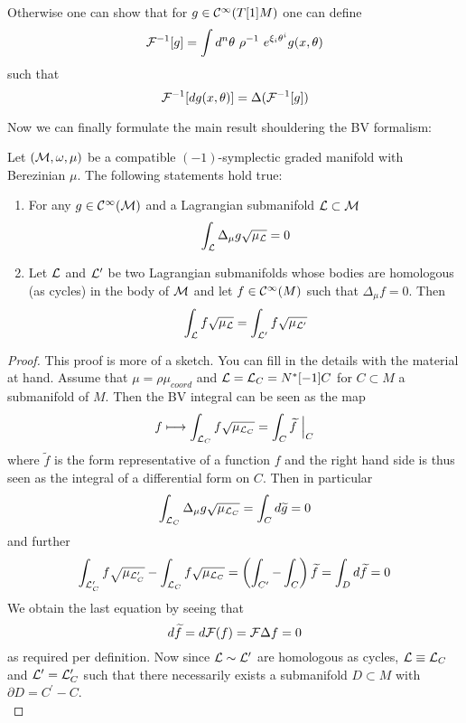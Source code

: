 Otherwise one can show that for $g \in \mathcal{C}^{\infty}(T[1]M)$ one can define
\begin{equation}
  \FF^{-1}[g] = \int d^n \theta \ \rho^{-1} \ e^{\xi_i \theta^i} g(x, \theta)
\end{equation}
such that
\begin{equation}
  {\mathcal{F}}^{-1}[dg(x, \theta)] = \Delta({\mathcal{F}}^{-1}[g])
\end{equation}

Now we can finally formulate the main result shouldering the BV formalism:

\begin{theo}
  Let $(\mathcal{M}, \omega, \mu)$ be a compatible $(-1)$-symplectic graded manifold with Berezinian $\mu$. The following statements hold true:
  \begin{enumerate}
    \item For any $g \in \mathcal{C}^{\infty}(\mathcal{M})$ and a Lagrangian submanifold $\mathcal{L} \subset \mathcal{M}$
    \begin{equation}
      \int_{\mathcal{L}} \Delta_\mu g \sqrt{\mu_{\mathcal{L}}} = 0
    \end{equation}

    \item Let $\mathcal{L}$ and $\mathcal{L}^\prime$ be two Lagrangian submanifolds whose bodies are homologous (as cycles) in the body of $\mathcal{M}$ and let $f \in \mathcal{C}^{\infty}(M)$ such that $\Delta_\mu f = 0$. Then
    \begin{equation}
      \int_{\mathcal{L}} f \sqrt{\mu_{\mathcal{L}}} = \int_{\mathcal{L}^\prime} f \sqrt{\mu_{\mathcal{L}^\prime}}
    \end{equation}
  \end{enumerate}
\begin{proof}
  This proof is more of a sketch. You can fill in the details with the material at hand. Assume that $\mu = \rho \mu_{coord}$ and $\mathcal{L} = \mathcal{L}_C = N^*[-1]C$ for $C \subset M$ a submanifold of $M$. Then the BV integral can be seen as the map
  \begin{equation}
    f \longmapsto \int_{\mathcal{L}_C} f \sqrt{\mu_{\mathcal{L}_C}} = \int_C \widetilde{f}\ \Big|_C
  \end{equation}
  where $\widetilde{f}$ is the form representative of a function $f$ and the right hand side is thus seen as the integral of a differential form on $C$. Then in particular
  \begin{equation}
    \int_{\mathcal{L}_C} \Delta_\mu g \sqrt{\mu_{\mathcal{L}_C}} = \int_C d\widetilde{g} = 0
  \end{equation}
  and further
  \begin{equation}
    \int_{\mathcal{L}^\prime_C} f \sqrt{\mu_{\mathcal{L}^\prime_C}} - \int_{\mathcal{L}_C} f \sqrt{\mu_{\mathcal{L}_C}} = \left( \int_{C^\prime} - \int_{C} \right) \widetilde{f} = \int_D d\widetilde{f} = 0
  \end{equation}
  We obtain the last equation by seeing that
  \begin{equation}
    d \widetilde{f} = d {\mathcal{F}}(f) = {\mathcal{F}} \Delta f = 0
  \end{equation}
  as required per definition. Now since $\mathcal{L} \sim \mathcal{L}^\prime$ are homologous as cycles, $\mathcal{L} \equiv \mathcal{L}_C$ and $\mathcal{L}^\prime = \mathcal{L}^\prime_C$ such that there necessarily exists a submanifold $D \subset M$ with $\partial D = C^\prime - C$.\\


\end{proof}
\end{theo}
